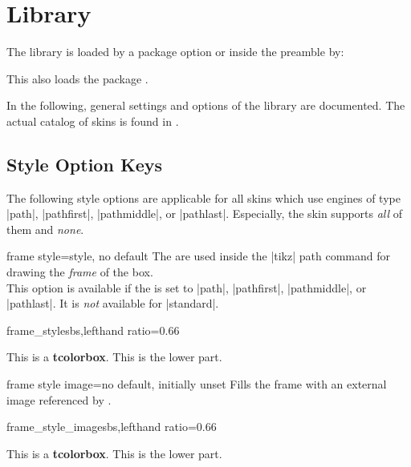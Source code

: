 \clearpage
\section{Library }\label{sec:skins}%
%
The library is loaded by a package option or inside the preamble by:
\begin{dispListing}
\end{dispListing}
This also loads the package .

In the following, general settings and options of the library are
documented.
The actual catalog of skins is found in .

\subsection{Style Option Keys}\label{subsec:addstyleoptions}
The following style options are applicable for all skins which
use engines of type |path|, |pathfirst|, |pathmiddle|, or |pathlast|.
Especially, the skin  supports \emph{all} of them
and  \emph{none}.

\begin{docTcbKey}{frame style}{=}{style, no default}
  The  are used inside the |tikz| path command
  for drawing the \emph{frame} of the box.\\
  This option is available if the  is set to
  |path|, |pathfirst|, |pathmiddle|, or |pathlast|.
  It is \emph{not} available for |standard|.
\begin{exdispExample*}{frame_style}{sbs,lefthand ratio=0.66}

\begin{tcolorbox}[enhanced,title=My title,
  frame style={left color=red!75!black,
               right color=blue!75!black}]
This is a \textbf{tcolorbox}.
\tcblower
This is the lower part.
\end{tcolorbox}
\end{exdispExample*}
\end{docTcbKey}


\begin{docTcbKey}{frame style image}{=}{no default, initially unset}
  Fills the frame with an external image referenced by .
\begin{exdispExample*}{frame_style_image}{sbs,lefthand ratio=0.66}

\begin{tcolorbox}[enhanced,title=My title,
  frame style image=blueshade.png]
This is a \textbf{tcolorbox}.
\tcblower
This is the lower part.
\end{tcolorbox}
\end{exdispExample*}
\end{docTcbKey}

